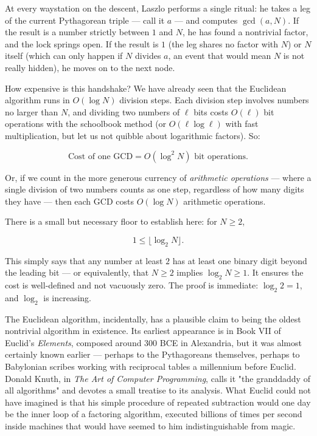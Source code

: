\documentclass[12pt, letterpaper, openany]{book}
\theoremstyle{definition}
\theoremstyle{remark}
\begin{document}
At every waystation on the descent, Laszlo performs a single ritual: he takes a leg of the current Pythagorean triple --- call it $a$ --- and computes $\gcd(a, N)$. If the result is a number strictly between $1$ and $N$, he has found a nontrivial factor, and the lock springs open. If the result is $1$ (the leg shares no factor with $N$) or $N$ itself (which can only happen if $N$ divides $a$, an event that would mean $N$ is not really hidden), he moves on to the next node.

How expensive is this handshake? We have already seen that the Euclidean algorithm runs in $O(\log N)$ division steps. Each division step involves numbers no larger than $N$, and dividing two numbers of $\ell$ bits costs $O(\ell)$ bit operations with the schoolbook method (or $O(\ell \log \ell)$ with fast multiplication, but let us not quibble about logarithmic factors). So:

\[
\text{Cost of one GCD} = O(\log^2 N) \text{ bit operations.}
\]

Or, if we count in the more generous currency of \textit{arithmetic operations} --- where a single division of two numbers counts as one step, regardless of how many digits they have --- then each GCD costs $O(\log N)$ arithmetic operations.

There is a small but necessary floor to establish here: for $N \ge 2$,

\[
1 \le \lfloor \log_2 N \rfloor.
\]

This simply says that any number at least $2$ has at least one binary digit beyond the leading bit --- or equivalently, that $N \ge 2$ implies $\log_2 N \ge 1$. It ensures the cost is well-defined and not vacuously zero. The proof is immediate: $\log_2 2 = 1$, and $\log_2$ is increasing.

The Euclidean algorithm, incidentally, has a plausible claim to being the oldest nontrivial algorithm in existence. Its earliest appearance is in Book VII of Euclid's \textit{Elements}, composed around 300 BCE in Alexandria, but it was almost certainly known earlier --- perhaps to the Pythagoreans themselves, perhaps to Babylonian scribes working with reciprocal tables a millennium before Euclid. Donald Knuth, in \textit{The Art of Computer Programming}, calls it "the granddaddy of all algorithms" and devotes a small treatise to its analysis. What Euclid could not have imagined is that his simple procedure of repeated subtraction would one day be the inner loop of a factoring algorithm, executed billions of times per second inside machines that would have seemed to him indistinguishable from magic.
\end{document}
